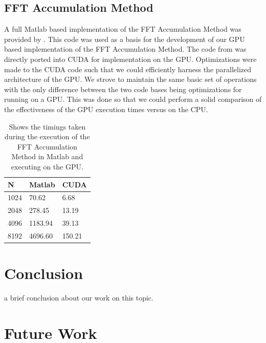 \subsection{FFT Accumulation Method}
\label{sect:FAM_result}
A full Matlab based implementation of the FFT Accumulation Method was provided by \cite{Costa96}.  This code was used as a basis for the development of our GPU based implementation of the FFT Accumulation Method.  The code from \cite{Costa96} was directly ported into CUDA for implementation on the GPU.  Optimizations were made to the CUDA code such that we could efficiently harness the parallelized architecture of the GPU.  We strove to maintain the same basic set of operations with the only difference between the two code bases being optimizations for running on a GPU.  This was done so that we could perform a solid comparison of the effectiveness of the GPU execution times versus on the CPU.

\begin{table}
\begin{center}
\begin{tabular}{|l|l|l|}
\hline
N & Matlab & CUDA \\
\hline
1024& 70.62 & 6.68 \\
2048 & 278.45 & 13.19 \\
4096 & 1183.94 & 39.13 \\
8192 & 4696.60 & 150.21 \\
\hline
\end{tabular}
\caption{Shows the timings taken during the execution of the FFT Accumulation Method in Matlab and executing on the GPU.}
\label{tbl:fam_timings}
\end{center}
\end{table}

\section{Conclusion}
a brief conclusion about our work on this topic.

\section{Future Work}
